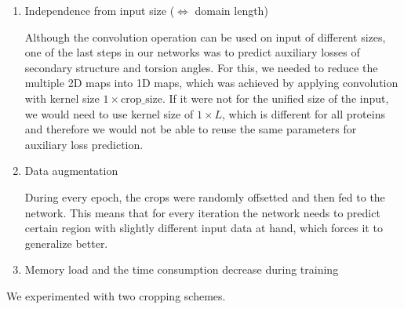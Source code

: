 \begin{enumerate}
    \item Independence from input size ($\Leftrightarrow$ domain length)

Although the convolution operation can be used on input of different sizes, one of the last steps in our networks was to predict auxiliary losses of secondary structure and torsion angles.
For this, we needed to reduce the multiple 2D maps into 1D maps, which was achieved by applying convolution with kernel size $1 \times \text{crop\_size}$.
If it were not for the unified size of the input, we would need to use kernel size of $1 \times L$, which is different for all proteins and therefore we would not be able to reuse the same parameters for auxiliary loss prediction.

    \item Data augmentation
    
During every epoch, the crops were randomly offsetted and then fed to the network. This means that for every iteration the network needs to predict certain region with slightly different input data at hand, which forces it to generalize better.

    \item Memory load and the time consumption decrease during training
    
    

\end{enumerate}

We experimented with two cropping schemes.

